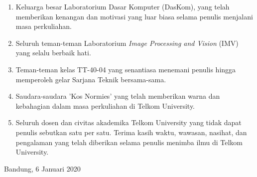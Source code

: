 \begin{enumerate}
\item Keluarga besar Laboratorium Dasar Komputer (DasKom), yang telah memberikan kenangan dan motivasi yang luar biasa selama penulis menjalani masa perkuliahan.
\item Seluruh teman-teman Laboratorium \textit{Image Processing and Vision} (IMV) yang selalu berbaik hati.
\item Teman-teman kelas TT-40-04 yang senantiasa menemani penulis hingga memperoleh gelar Sarjana Teknik bersama-sama.
\item Saudara-saudara 'Kos Normies' yang telah memberikan warna dan kebahagian dalam masa perkuliahan di Telkom University.
\item Seluruh dosen dan civitas akademika Telkom University yang tidak dapat penulis sebutkan satu per satu. Terima kasih waktu, wawasan, nasihat, dan pengalaman yang telah diberikan selama penulis menimba ilmu di Telkom University.
\end{enumerate}
\vspace*{0.1cm}
\begin{flushright}
Bandung, 6 Januari 2020\\[0.1cm]
\vspace*{1cm}
\penulis

\end{flushright}